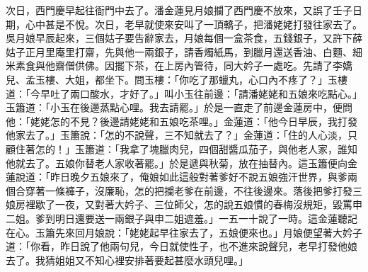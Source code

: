 次日，西門慶早起往衙門中去了。潘金蓮見月娘攔了西門慶不放來，又誤了壬子日期，心中甚是不悅。次日，老早就使來安叫了一頂轎子，把潘姥姥打發往家去了。吳月娘早辰起來，三個姑子要告辭家去，月娘每個一盒茶食，五錢銀子，又許下薛姑子正月里庵里打齋，先與他一兩銀子，請香燭紙馬，到臘月還送香油、白麵、細米素食與他齋僧供佛。因擺下茶，在上房內管待，同大妗子一處吃。先請了李嬌兒、孟玉樓、大姐，都坐下。問玉樓：「你吃了那蠟丸，心口內不疼了？」玉樓道：「今早吐了兩口酸水，才好了。」叫小玉往前邊：「請潘姥姥和五娘來吃點心。」玉簫道：「小玉在後邊蒸點心哩。我去請罷。」於是一直走了前邊金蓮房中，便問他：「姥姥怎的不見？後邊請姥姥和五娘吃茶哩。」金蓮道：「他今日早辰，我打發他家去了。」玉簫說：「怎的不說聲，三不知就去了？」金蓮道：「住的人心淡，只顧住著怎的！」玉簫道：「我拿了塊臘肉兒，四個甜醬瓜茄子，與他老人家，誰知他就去了。五娘你替老人家收著罷。」於是遞與秋菊，放在抽替內。這玉簫便向金蓮說道：「昨日晚夕五娘來了，俺娘如此這般對著爹好不說五娘強汗世界，與爹兩個合穿著一條褲子，沒廉恥，怎的把攔老爹在前邊，不往後邊來。落後把爹打發三娘房裡歇了一夜，又對著大妗子、三位師父，怎的說五娘慣的春梅沒規矩，毀罵申二姐。爹到明日還要送一兩銀子與申二姐遮羞。」一五一十說了一時。這金蓮聽記在心。玉簫先來回月娘說：「姥姥起早往家去了，五娘便來也。」月娘便望著大妗子道：「你看，昨日說了他兩句兒，今日就使性子，也不進來說聲兒，老早打發他娘去了。我猜姐姐又不知心裡安排著要起甚麼水頭兒哩。」

